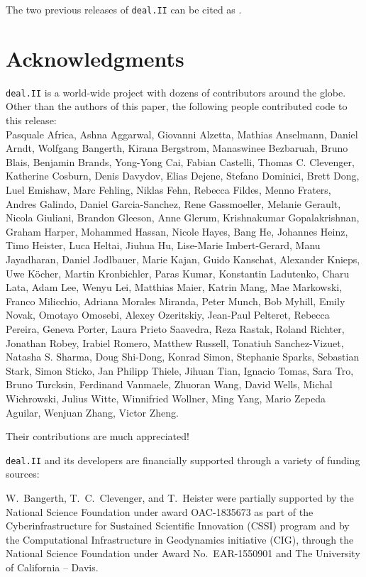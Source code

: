 \documentclass{ansarticle-preprint}
\newcommand{\specialword}[1]{\texttt{#1}}
\newcommand{\dealii}{{\specialword{deal.II}}\xspace}
\begin{document}
The two previous releases of \dealii can be cited as
\cite{dealII90,dealII91}.


\section{Acknowledgments}

\dealii is a world-wide project with dozens of contributors around the
globe. Other than the authors of this paper, the following people
contributed code to this release:\\
%
%
Pasquale Africa,
Ashna Aggarwal,
Giovanni Alzetta,
Mathias Anselmann,
Daniel Arndt,
Wolfgang Bangerth,
Kirana Bergstrom,
Manaswinee Bezbaruah,
Bruno Blais,
Benjamin Brands,
Yong-Yong Cai,
Fabian Castelli,
Thomas C. Clevenger,
Katherine Cosburn,
Denis Davydov,
Elias Dejene,
Stefano Dominici,
Brett Dong,
Luel Emishaw,
Marc Fehling,
Niklas Fehn,
Rebecca Fildes,
Menno Fraters,
Andres Galindo,
Daniel Garcia-Sanchez,
Rene Gassmoeller,
Melanie Gerault,
Nicola Giuliani,
Brandon Gleeson,
Anne Glerum,
Krishnakumar Gopalakrishnan,
Graham Harper,
Mohammed Hassan,
Nicole Hayes,
Bang He,
Johannes Heinz,
Timo Heister,
Luca Heltai,
Jiuhua Hu,
Lise-Marie Imbert-Gerard,
Manu Jayadharan,
Daniel Jodlbauer,
Marie Kajan,
Guido Kanschat,
Alexander Knieps,
Uwe K{\"o}cher,
Martin Kronbichler,
Paras Kumar,
Konstantin Ladutenko,
Charu Lata,
Adam Lee,
Wenyu Lei,
Matthias Maier,
Katrin Mang,
Mae Markowski,
Franco Milicchio,
Adriana Morales Miranda,
Peter Munch,
Bob Myhill,
Emily Novak,
Omotayo Omosebi,
Alexey Ozeritskiy,
Jean-Paul Pelteret,
Rebecca Pereira,
Geneva Porter,
Laura Prieto Saavedra,
Reza Rastak,
Roland Richter,
Jonathan Robey,
Irabiel Romero,
Matthew Russell,
Tonatiuh Sanchez-Vizuet,
Natasha S. Sharma,
Doug Shi-Dong,
Konrad Simon,
Stephanie Sparks,
Sebastian Stark,
Simon Sticko,
Jan Philipp Thiele,
Jihuan Tian,
Ignacio Tomas,
Sara Tro,
Bruno Turcksin,
Ferdinand Vanmaele,
Zhuoran Wang,
David Wells,
Michal Wichrowski,
Julius Witte,
Winnifried Wollner,
Ming Yang,
Mario Zepeda Aguilar,
Wenjuan Zhang,
Victor Zheng.

Their contributions are much appreciated!


\bigskip

\dealii and its developers are financially supported through a
variety of funding sources:

W.~Bangerth, T.~C.~Clevenger, and T.~Heister were partially
supported by the National Science Foundation under award OAC-1835673
as part of the Cyberinfrastructure for Sustained Scientific Innovation (CSSI)
program  and by the Computational Infrastructure
in Geodynamics initiative (CIG), through the National Science
Foundation under Award No.~EAR-1550901 and The
University of California -- Davis.
\end{document}
